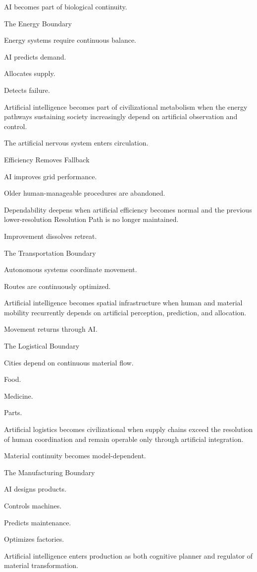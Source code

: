 AI becomes part of biological continuity.

The Energy Boundary

Energy systems require continuous balance.

AI predicts demand.

Allocates supply.

Detects failure.

Artificial intelligence becomes part of civilizational metabolism when the energy pathways sustaining society increasingly depend on artificial observation and control.

The artificial nervous system enters circulation.

Efficiency Removes Fallback

AI improves grid performance.

Older human-manageable procedures are abandoned.

Dependability deepens when artificial efficiency becomes normal and the previous lower-resolution Resolution Path is no longer maintained.

Improvement dissolves retreat.

The Transportation Boundary

Autonomous systems coordinate movement.

Routes are continuously optimized.

Artificial intelligence becomes spatial infrastructure when human and material mobility recurrently depends on artificial perception, prediction, and allocation.

Movement returns through AI.

The Logistical Boundary

Cities depend on continuous material flow.

Food.

Medicine.

Parts.

Artificial logistics becomes civilizational when supply chains exceed the resolution of human coordination and remain operable only through artificial integration.

Material continuity becomes model-dependent.

The Manufacturing Boundary

AI designs products.

Controls machines.

Predicts maintenance.

Optimizes factories.

Artificial intelligence enters production as both cognitive planner and regulator of material transformation.

